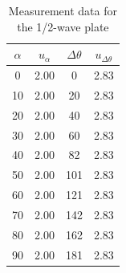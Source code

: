 \documentclass[12pt,a4paper]{article}
\begin{document}
\begin{table}[H]
    \centering
    \begin{tabular}{|c|c|c|c|}
    \hline
    $\alpha$  & $u_\alpha$     &  $\Delta\theta$   &  $u_{\Delta\theta}$    \\ \hline
    0  & 2.00 & 0   & 2.83 \\ \hline
    10 & 2.00 & 20  & 2.83 \\ \hline
    20 & 2.00 & 40  & 2.83 \\ \hline
    30 & 2.00 & 60  & 2.83 \\ \hline
    40 & 2.00 & 82  & 2.83 \\ \hline
    50 & 2.00 & 101 & 2.83 \\ \hline
    60 & 2.00 & 121 & 2.83 \\ \hline
    70 & 2.00 & 142 & 2.83 \\ \hline
    80 & 2.00 & 162 & 2.83 \\ \hline
    90 & 2.00 & 181 & 2.83 \\ \hline
    \end{tabular}
    \caption{Measurement data for the 1/2-wave plate}
    \label{changedata}
\end{table}
\end{document}
